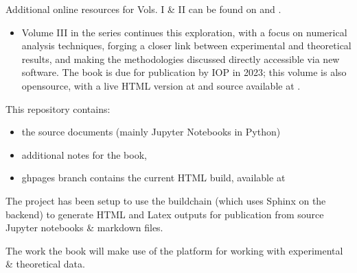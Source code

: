 \documentclass[letterpaper,table,10pt,english]{jupyterBook}
\begin{document}
\sphinxAtStartPar
Additional online resources for Vols. I \& II can be found on  and .
\begin{itemize}
\item {} 
\sphinxAtStartPar
Volume III in the series continues this exploration, with a focus on numerical analysis techniques, forging a closer link between experimental and theoretical results, and making the methodologies discussed directly accessible via new software. The book is due for publication by IOP in 2023; this volume is also open\sphinxhyphen{}source, with a live HTML version at  and source available at .

\end{itemize}

\begin{DUlineblock}{0em}
\item[] 
\end{DUlineblock}

\sphinxAtStartPar
This repository contains:
\begin{itemize}
\item {} 
\sphinxAtStartPar
{} the source documents (mainly Jupyter Notebooks in Python)

\item {} 
\sphinxAtStartPar
{} additional notes for the book,

\item {} 
\sphinxAtStartPar
gh\sphinxhyphen{}pages branch contains the current HTML build, available at 

\end{itemize}

\sphinxAtStartPar
The project has been setup to use the  build\sphinxhyphen{}chain (which uses Sphinx on the back\sphinxhyphen{}end) to generate HTML and Latex outputs for publication from source Jupyter notebooks \& markdown files.

\sphinxAtStartPar
The work  the book will make use of the  platform for working with experimental \& theoretical data.
\end{document}
